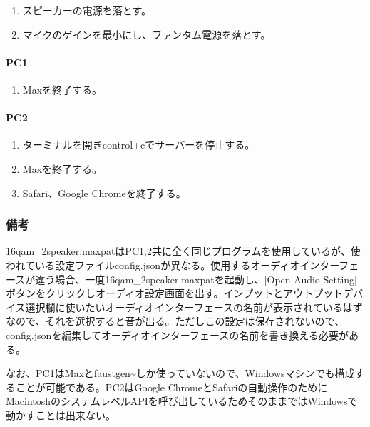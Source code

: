 \documentclass[a4paper]{jsarticle}
\begin{document}
\begin{enumerate}
\def\labelenumi{\arabic{enumi}.}
\tightlist
\item
  スピーカーの電源を落とす。
\item
  マイクのゲインを最小にし、ファンタム電源を落とす。
\end{enumerate}

\paragraph{PC1}\label{pc1-1}

\begin{enumerate}
\def\labelenumi{\arabic{enumi}.}
\tightlist
\item
  Maxを終了する。
\end{enumerate}

\paragraph{PC2}\label{pc2-1}

\begin{enumerate}
\def\labelenumi{\arabic{enumi}.}
\tightlist
\item
  ターミナルを開きcontrol+cでサーバーを停止する。
\item
  Maxを終了する。
\item
  Safari、Google Chromeを終了する。
\end{enumerate}

\subsubsection{備考}\label{ux5099ux8003}

16qam\_2speaker.maxpatはPC1,2共に全く同じプログラムを使用しているが、使われている設定ファイルconfig.jsonが異なる。使用するオーディオインターフェースが違う場合、一度16qam\_2speaker.maxpatを起動し、{[}Open
Audio
Setting{]}ボタンをクリックしオーディオ設定画面を出す。インプットとアウトプットデバイス選択欄に使いたいオーディオインターフェースの名前が表示されているはずなので、それを選択すると音が出る。ただしこの設定は保存されないので、config.jsonを編集してオーディオインターフェースの名前を書き換える必要がある。

なお、PC1はMaxとfaustgen\textasciitilde{}しか使っていないので、Windowsマシンでも構成することが可能である。PC2はGoogle
ChromeとSafariの自動操作のためにMacintoshのシステムレベルAPIを呼び出しているためそのままではWindowsで動かすことは出来ない。
\end{document}
